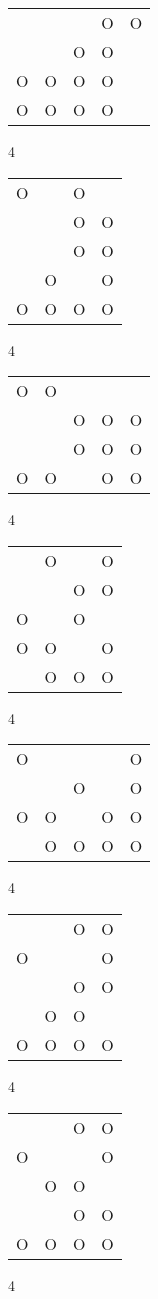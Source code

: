 \begin{tabular}{|m{0.2cm}m{0.2cm}m{0.2cm}m{0.2cm}m{0.2cm}|}\hline
 & & &O&O\\
 & &O&O& \\
O&O&O&O& \\
O&O&O&O& \\
\hline\end{tabular}4
\begin{tabular}{|m{0.2cm}m{0.2cm}m{0.2cm}m{0.2cm}|}\hline
O& &O& \\
 & &O&O\\
 & &O&O\\
 &O& &O\\
O&O&O&O\\
\hline\end{tabular}4
\begin{tabular}{|m{0.2cm}m{0.2cm}m{0.2cm}m{0.2cm}m{0.2cm}|}\hline
O&O& & & \\
 & &O&O&O\\
 & &O&O&O\\
O&O& &O&O\\
\hline\end{tabular}4
\begin{tabular}{|m{0.2cm}m{0.2cm}m{0.2cm}m{0.2cm}|}\hline
 &O& &O\\
 & &O&O\\
O& &O& \\
O&O& &O\\
 &O&O&O\\
\hline\end{tabular}4
\begin{tabular}{|m{0.2cm}m{0.2cm}m{0.2cm}m{0.2cm}m{0.2cm}|}\hline
O& & & &O\\
 & &O& &O\\
O&O& &O&O\\
 &O&O&O&O\\
\hline\end{tabular}4
\begin{tabular}{|m{0.2cm}m{0.2cm}m{0.2cm}m{0.2cm}|}\hline
 & &O&O\\
O& & &O\\
 & &O&O\\
 &O&O& \\
O&O&O&O\\
\hline\end{tabular}4
\begin{tabular}{|m{0.2cm}m{0.2cm}m{0.2cm}m{0.2cm}|}\hline
 & &O&O\\
O& & &O\\
 &O&O& \\
 & &O&O\\
O&O&O&O\\
\hline\end{tabular}4
